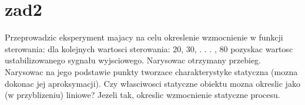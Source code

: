 \section{zad2}
\label{lab:zad2}

Przeprowadzic eksperyment majacy na celu okreslenie wzmocnienie w funkcji sterowania:
dla kolejnych wartosci sterowania: 20, 30, . . . , 80 pozyskac wartosc ustabilizowanego
sygnału wyjsciowego. Narysowac otrzymany przebieg. Narysowac na jego
podstawie punkty tworzace charakterystyke statyczna (mozna dokonac jej aproksymacji).
Czy własciwosci statyczne obiektu mozna okreslic jako (w przyblizeniu) liniowe?
Jezeli tak, okreslic wzmocnienie statyczne procesu.

%    



\newpage
